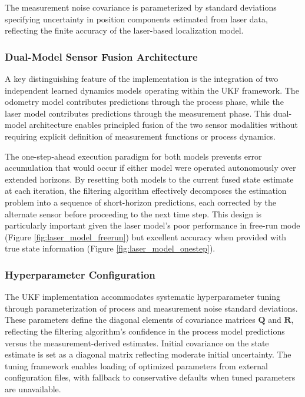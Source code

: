 \documentclass[conference]{IEEEtran}
\begin{document}
The measurement noise covariance is parameterized by standard deviations specifying uncertainty in position components estimated from laser data, reflecting the finite accuracy of the laser-based localization model.

\subsubsection{Dual-Model Sensor Fusion Architecture}

A key distinguishing feature of the implementation is the integration of two independent learned dynamics models operating within the UKF framework. The odometry model contributes predictions through the process phase, while the laser model contributes predictions through the measurement phase. This dual-model architecture enables principled fusion of the two sensor modalities without requiring explicit definition of measurement functions or process dynamics.

The one-step-ahead execution paradigm for both models prevents error accumulation that would occur if either model were operated autonomously over extended horizons. By resetting both models to the current fused state estimate at each iteration, the filtering algorithm effectively decomposes the estimation problem into a sequence of short-horizon predictions, each corrected by the alternate sensor before proceeding to the next time step. This design is particularly important given the laser model's poor performance in free-run mode (Figure \ref{fig:laser_model_freerun}) but excellent accuracy when provided with true state information (Figure \ref{fig:laser_model_onestep}).

\subsubsection{Hyperparameter Configuration}

The UKF implementation accommodates systematic hyperparameter tuning through parameterization of process and measurement noise standard deviations. These parameters define the diagonal elements of covariance matrices $\mathbf{Q}$ and $\mathbf{R}$, reflecting the filtering algorithm's confidence in the process model predictions versus the measurement-derived estimates. Initial covariance on the state estimate is set as a diagonal matrix reflecting moderate initial uncertainty. The tuning framework enables loading of optimized parameters from external configuration files, with fallback to conservative defaults when tuned parameters are unavailable.
\end{document}
